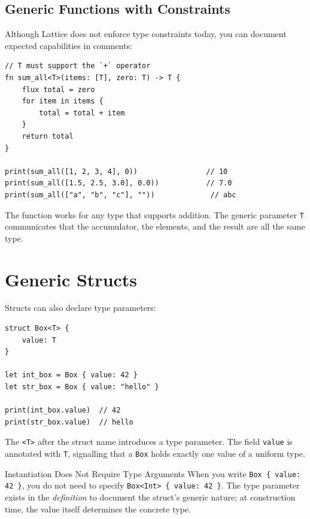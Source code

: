\subsection{Generic Functions with Constraints}

Although Lattice does not enforce type constraints today, you can document
expected capabilities in comments:

\begin{lstlisting}[language=Lattice, caption={Documenting type expectations}]
// T must support the `+` operator
fn sum_all<T>(items: [T], zero: T) -> T {
    flux total = zero
    for item in items {
        total = total + item
    }
    return total
}

print(sum_all([1, 2, 3, 4], 0))                // 10
print(sum_all([1.5, 2.5, 3.0], 0.0))           // 7.0
print(sum_all(["a", "b", "c"], ""))             // abc
\end{lstlisting}

The function works for any type that supports addition. The generic
parameter \lstinline|T| communicates that the accumulator, the elements,
and the result are all the same type.

\section{Generic Structs}\label{sec:generics-structs}

Structs can also declare type parameters:

\begin{lstlisting}[language=Lattice, caption={A generic Box struct}]
struct Box<T> {
    value: T
}

let int_box = Box { value: 42 }
let str_box = Box { value: "hello" }

print(int_box.value)  // 42
print(str_box.value)  // hello
\end{lstlisting}

The \lstinline|<T>| after the struct name introduces a type parameter.
The field \lstinline|value| is annotated with \lstinline|T|, signalling
that a \lstinline|Box| holds exactly one value of a uniform type.

\begin{tipbox}{Instantiation Does Not Require Type Arguments}
When you write \lstinline|Box { value: 42 }|, you do not need to specify
\lstinline|Box<Int> { value: 42 }|. The type parameter exists in the
\emph{definition} to document the struct's generic nature; at construction
time, the value itself determines the concrete type.
\end{tipbox}

